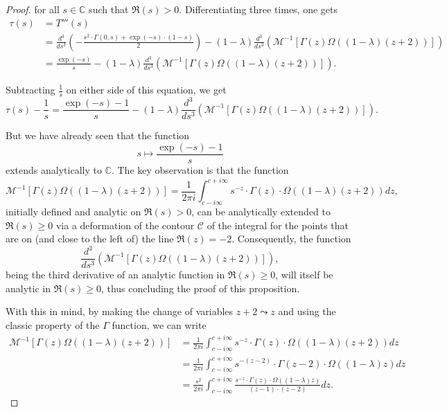 \documentclass[11pt]{amsart}
\numberwithin{equation}{section}
\newcommand{\C}{\mathbb{C}}
\newcommand{\diint}{\displaystyle \int}
\newcommand{\difrac}{\displaystyle \frac}
\begin{document}
\begin{proof}
\noindent for all $s \in \C$ such that $\Re(s) > 0$. Differentiating three times, one gets \begin{equation*} \begin{split} \tau(s) & = T'''(s) \\ & = \difrac{d^3}{ds^3} \left(-\difrac{s^2 \cdot \Gamma(0,s) + \exp(-s) \cdot (1-s)}{2}\right) - (1 - \lambda) \difrac{d^3}{ds^3} \left(\mathscr{M}^{-1}[\Gamma(z) \Omega((1 - \lambda)(z + 2))]\right) \\ & = \difrac{\exp(-s)}{s} - (1 - \lambda) \difrac{d^3}{ds^3} \left(\mathscr{M}^{-1}[\Gamma(z) \Omega((1 - \lambda)(z + 2))]\right). \end{split} \end{equation*}

Subtracting $\difrac{1}{s}$ on either side of this equation, we get $$\tau(s) - \difrac{1}{s} = \difrac{\exp(-s) - 1}{s} - (1 - \lambda) \difrac{d^3}{ds^3} \left(\mathscr{M}^{-1}[\Gamma(z) \Omega((1 - \lambda)(z + 2))]\right).$$

But we have already seen that the function $$s \mapsto \difrac{\exp(-s) - 1}{s}$$ extends analytically to $\C$. The key observation is that the function $$\mathscr{M}^{-1}[\Gamma(z) \Omega((1 - \lambda)(z + 2))] = \difrac{1}{2\pi i} \diint_{c - i\infty}^{c + i\infty} s^{-z} \cdot \Gamma(z) \cdot \Omega((1-\lambda)(z+2)) dz,$$ initially defined and analytic on $\Re(s) > 0$, can be analytically extended to $\Re(s) \geq 0$ via a deformation of the contour $\mathcal{C}$ of the integral for the points that are on (and close to the left of) the line $\Re(z) = -2$. Consequently, the function $$\difrac{d^3}{ds^3} \left(\mathscr{M}^{-1}[\Gamma(z) \Omega((1 - \lambda)(z + 2))]\right),$$ being the third derivative of an analytic function in $\Re(s) \geq 0$, will itself be analytic in $\Re(s) \geq 0$, thus concluding the proof of this proposition.

With this in mind, by making the change of variables $z + 2 \leadsto z$ and using the classic property of the $\Gamma$ function, we can write \begin{equation*} \begin{split} \mathscr{M}^{-1}[\Gamma(z) \Omega((1 - \lambda)(z + 2))] & = \difrac{1}{2\pi i} \diint_{c - i\infty}^{c + i\infty} s^{-z} \cdot \Gamma(z) \cdot \Omega((1-\lambda)(z+2)) dz \\ & = \difrac{1}{2\pi i} \diint_{c - i\infty}^{c + i\infty} s^{-(z - 2)} \cdot \Gamma(z-2) \cdot \Omega((1 - \lambda)z) dz \\ & = \difrac{s^2}{2\pi i} \diint_{c - i\infty}^{c + i\infty} \difrac{s^{-z} \cdot \Gamma(z) \cdot \Omega((1 - \lambda)z)}{(z - 1) \cdot (z - 2)} dz. \end{split} \end{equation*}


\end{proof}
\end{document}
